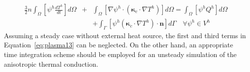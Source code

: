 \documentclass[runningheads]{llncs}
\begin{document}
\begin{eqnarray}
\frac{3}{2} n \int_{\Omega} [\psi^h\frac{d T^h}{d t}]d\Omega &+& \int_{\Omega} [\nabla \psi^h \cdot (\bm{\kappa}_c \cdot \nabla T^h)]d\Omega  = \int_{\Omega} [\psi^h Q^h]d\Omega \nonumber\\
& &+ \int_{\Gamma} [\psi^h (\bm{\kappa}_c \cdot \nabla T^h)\cdot \bm{n}] d\Gamma  \quad \forall \psi^h \in V^h  \label{eq:plasma13}
\end{eqnarray} 
Assuming a steady case without external heat source, the first and third terms in Equation~\eqref{eq:plasma13} can be neglected. On the other hand, an appropriate time integration scheme should be employed for an unsteady simulation of the anisotropic thermal conduction. 









\nocite{*}


\end{document}
